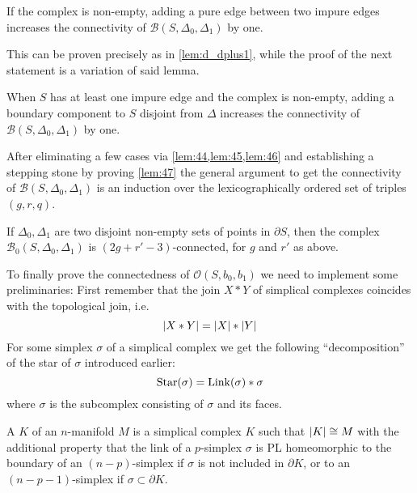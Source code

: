 \begin{lemma}[label=lem:46]
	If the complex is non-empty, adding a pure edge between two impure edges increases the connectivity of $\mathcal{B}(S,\Delta_0,\Delta_1)$ by one.
\end{lemma}

This can be proven precisely as in \autoref{lem:d_dplus1}, while the proof of the next statement is a variation of said lemma.

\begin{lemma}[label=lem:47]
	When $S$ has at least one impure edge and the complex is non-empty, adding a boundary component to $S$ disjoint from $\Delta$ increases the connectivity of $\mathcal{B}(S,\Delta_0,\Delta_1)$ by one.
\end{lemma}

After eliminating a few cases via \cref{lem:44,lem:45,lem:46} and establishing a stepping stone by proving \cref{lem:47} the general argument to get the connectivity of $\mathcal{B}(S,\Delta_0,\Delta_1)$ is an induction over the lexicographically ordered set of triples $(g,r,q)$.

\begin{theorem}[label=thm:48]
	If $\Delta_0, \Delta_1$ are two disjoint non-empty sets of points in $\partial S$, then the complex $\mathcal{B}_0(S,\Delta_0,\Delta_1)$ is $(2g+r'-3)$-connected, for $g$ and $r'$ as above.
\end{theorem}

To finally prove the connectedness of $\mathcal{O}(S,b_0,b_1)$ we need to implement some preliminaries:
First remember that the join $X * Y$ of simplical complexes coincides with the topological join, i.e.
\[
	\abs*{X * Y} = \abs*{X} * \abs*{Y}   
\]
For some simplex $\sigma$ of a simplical complex we get the following \enquote{decomposition} of the star of $\sigma$ introduced earlier:
\[
	\Star(\sigma) = \Link(\sigma) * \sigma
\]
where $\sigma$ is the subcomplex consisting of $\sigma$ and its faces.

\begin{definition*}
	A  $K$ of an $n$-manifold $M$ is a simplical complex $K$ such that $\abs*{K} \cong M$ with the additional property that the link of a $p$-simplex $\sigma$ is PL homeomorphic to the boundary of an $(n-p)$-simplex if $\sigma$ is not included in $\partial K$, or to an $(n-p-1)$-simplex if $\sigma \subset \partial K$.
\end{definition*}

